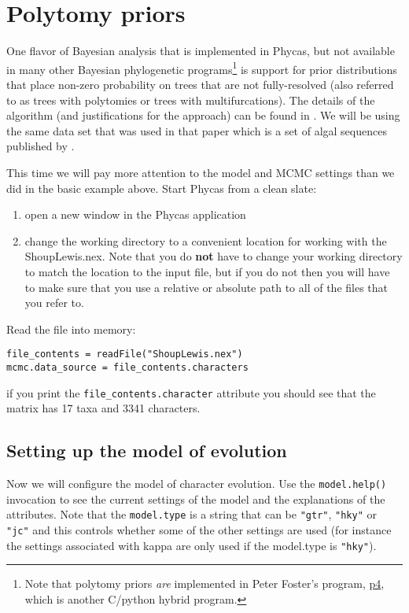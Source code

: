 \documentclass{article}
\newcommand{\cmd}[1]{\texttt{#1}\xspace}
\newcommand{\phycas}{Phycas\xspace}
\newcommand{\localfile}[1]{\textsf{#1}\xspace}
\begin{document}



\section{Polytomy priors}
One flavor of Bayesian analysis that is implemented in \phycas, but not available in many other Bayesian phylogenetic programs\footnote{Note that polytomy priors {\em are} implemented in Peter Foster's program, \href{http://bmnh.org/~pf/p4.html}{p4}, which is another C/python hybrid program.} is support for prior distributions that place non-zero probability on trees that are not fully-resolved (also referred to as trees with polytomies or trees with multifurcations).
The details of the algorithm (and justifications for the approach) can be found in \citet{LewisHH2005}.
We will be using the same data set that was used in that paper which is a set of algal sequences published by \citet{ShoupL2003}.

This time we will pay more attention to the model and MCMC settings than we did in the basic example above.
Start \phycas from a clean slate:
\begin{enumerate}
	\item open a new window in the \phycas application
	\item change the working directory to a convenient location for working with the \localfile{ShoupLewis.nex}. Note that you do {\bf not} have to change your working directory to match the location to the input file, but if you do not then you will have to make sure that you use a relative or absolute path to all of the files that you refer to.
\end{enumerate}

Read the file into memory:
\begin{verbatim}
file_contents = readFile("ShoupLewis.nex")
mcmc.data_source = file_contents.characters
\end{verbatim}
if you print the \cmd{file\_contents.character} attribute you should see that the matrix has 17 taxa and 3341 characters.

\subsection{Setting up the model of evolution}
Now we will configure the model of character evolution. 
Use the \cmd{model.help()} invocation to see the current settings of the model and the explanations of the
attributes.
Note that the \cmd{model.type} is a string that can be \texttt{"gtr"}, \texttt{"hky"} or \texttt{"jc"} and this controls whether some of the other settings are used (for instance the settings associated with kappa are only used if the model.type is \texttt{"hky"}).
\end{document}

